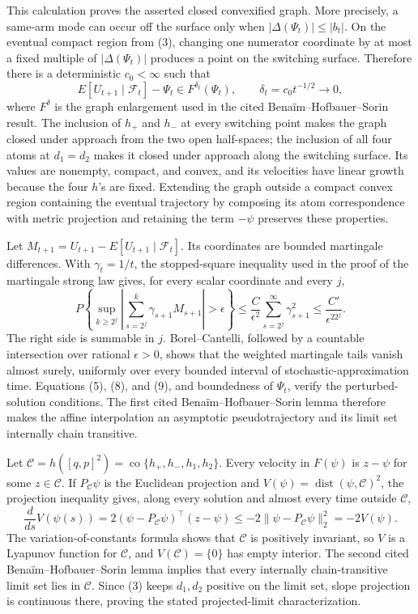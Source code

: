 This calculation proves the asserted closed convexified graph. More precisely, a same-arm mode can occur off the surface only when \(|\Delta(\Psi_t)|\le |b_t|\). On the eventual compact region from (3), changing one numerator coordinate by at most a fixed multiple of \(|\Delta(\Psi_t)|\) produces a point on the switching surface. Therefore there is a deterministic \(c_0<\infty\) such that
\[
 E[U_{t+1}\mid\mathcal F_t]-\Psi_t\in F^{\delta_t}(\Psi_t),
 \qquad \delta_t=c_0t^{-1/2}\longrightarrow0, \tag{8}
\]
where \(F^{\delta}\) is the graph enlargement used in the cited Bena\"im--Hofbauer--Sorin result. The inclusion of \(h_+\) and \(h_-\) at every switching point makes the graph closed under approach from the two open half-spaces; the inclusion of all four atoms at \(d_1=d_2\) makes it closed under approach along the switching surface. Its values are nonempty, compact, and convex, and its velocities have linear growth because the four \(h\)'s are fixed. Extending the graph outside a compact convex region containing the eventual trajectory by composing its atom correspondence with metric projection and retaining the term \(-\psi\) preserves these properties.

Let \(M_{t+1}=U_{t+1}-E[U_{t+1}\mid\mathcal F_t]\). Its coordinates are bounded martingale differences. With \(\gamma_t=1/t\), the stopped-square inequality used in the proof of the martingale strong law gives, for every scalar coordinate and every \(j\),
\[
 P\left\{\sup_{k\ge2^j}\left|\sum_{s=2^j}^k\gamma_{s+1}M_{s+1}\right|>\epsilon\right\}
 \le \frac{C}{\epsilon^2}\sum_{s=2^j}^{\infty}\gamma_{s+1}^2
 \le\frac{C'}{\epsilon^22^j}. \tag{9}
\]
The right side is summable in \(j\). Borel--Cantelli, followed by a countable intersection over rational \(\epsilon>0\), shows that the weighted martingale tails vanish almost surely, uniformly over every bounded interval of stochastic-approximation time. Equations (5), (8), and (9), and boundedness of \(\Psi_t\), verify the perturbed-solution conditions. The first cited Bena\"im--Hofbauer--Sorin lemma therefore makes the affine interpolation an asymptotic pseudotrajectory and its limit set internally chain transitive.

Let \(\mathcal C=h([q,p]^2)=\operatorname{co}\{h_+,h_-,h_1,h_2\}\). Every velocity in \(F(\psi)\) is \(z-\psi\) for some \(z\in\mathcal C\). If \(P_{\mathcal C}\psi\) is the Euclidean projection and \(V(\psi)=\operatorname{dist}(\psi,\mathcal C)^2\), the projection inequality gives, along every solution and almost every time outside \(\mathcal C\),
\[
 \frac{d}{ds}V(\psi(s))
 =2(\psi-P_{\mathcal C}\psi)^\top(z-\psi)
 \le-2\|\psi-P_{\mathcal C}\psi\|_2^2=-2V(\psi). \tag{10}
\]
The variation-of-constants formula shows that \(\mathcal C\) is positively invariant, so \(V\) is a Lyapunov function for \(\mathcal C\), and \(V(\mathcal C)=\{0\}\) has empty interior. The second cited Bena\"im--Hofbauer--Sorin lemma implies that every internally chain-transitive limit set lies in \(\mathcal C\). Since (3) keeps \(d_1,d_2\) positive on the limit set, slope projection is continuous there, proving the stated projected-limit characterization.

